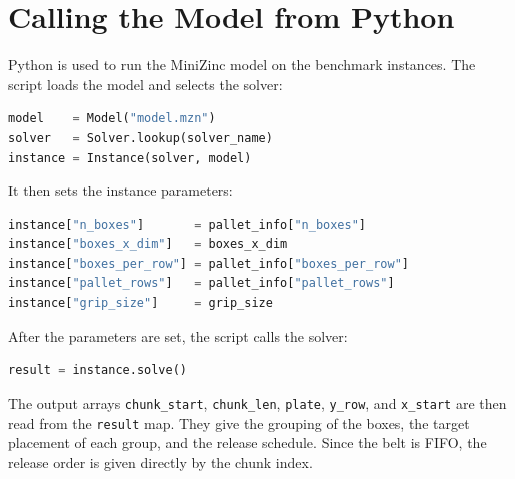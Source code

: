 \section{Calling the Model from Python}
\label{sec:python}

Python is used to run the MiniZinc model on the benchmark instances. The script
loads the model and selects the solver:

\vspace{0.3cm}
\begin{lstlisting}[language=Python]
model    = Model("model.mzn")
solver   = Solver.lookup(solver_name)
instance = Instance(solver, model)
\end{lstlisting}
\vspace{0.3cm}

It then sets the instance parameters:

\vspace{0.3cm}
\begin{lstlisting}[language=Python]
instance["n_boxes"]       = pallet_info["n_boxes"]
instance["boxes_x_dim"]   = boxes_x_dim
instance["boxes_per_row"] = pallet_info["boxes_per_row"]
instance["pallet_rows"]   = pallet_info["pallet_rows"]
instance["grip_size"]     = grip_size
\end{lstlisting}
\vspace{0.3cm}

After the parameters are set, the script calls the solver:

\vspace{0.3cm}
\begin{lstlisting}[language=Python]
result = instance.solve()
\end{lstlisting}
\vspace{0.3cm}

The output arrays \texttt{chunk\_start}, \texttt{chunk\_len},
\texttt{plate}, \texttt{y\_row}, and \texttt{x\_start} are then read from the
\texttt{result} map. They give the grouping of the boxes, the target placement
of each group, and the release schedule. Since the belt is FIFO, the release
order is given directly by the chunk index.